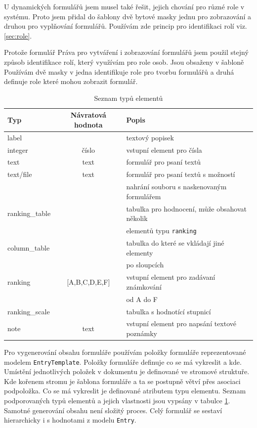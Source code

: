 U dynamických formulářů jsem musel také řešit, jejich chování pro různé role v systému. Proto jsem přidal do šablony dvě bytové masky jednu pro zobrazování a druhou pro vyplňování formulářů. Používám zde princip pro identifikaci rolí viz. \ref{sec:role}.

Protože formulář Práva pro vytváření i zobrazování formulářů jsem použil stejný způsob identifikace rolí, který využívám pro role osob. Jsou obsaženy v šabloně Používám dvě masky v  jedna  identifikuje role pro tvorbu formulářů a druhá definuje role které mohou zobrazit formulář.


\begin{table}[h]
\begin{center}
\begin{tabular}{|l|c|l|}

\hline
\textbf{Typ} & \textbf{Návratová hodnota} & \textbf{Popis} \\ \hline
label &  & textový popisek \\\hline
integer & číslo & vstupní element pro čísla \\ \hline
text & text & formulář pro psaní textů \\\hline
text/file & text & formulář pro psaní textů s možností \\ & &  nahrání souboru s naskenovaným formulářem \\\hline
ranking\_table &  & tabulka pro hodnocení, může obsahovat několik \\ & & elementů typu \verb|ranking| \\\hline
column\_table & & tabulka do které se vkládají jiné elementy \\ & &  po sloupcích \\\hline
ranking & [A,B,C,D,E,F] & vstupní element pro zadávaní známkování  \\ & &   od A do F \\\hline
ranking\_scale & & tabulka s hodnotící stupnicí \\\hline
note & text & vstupní element pro napsání textové poznámky \\\hline

\end{tabular}
\caption{Seznam typů elementů}
\label{tab:elements}
\end{center}
\end{table}

Pro vygenerování obsahu formuláře používám položky formuláře reprezentované modelem \verb|EntryTemplate|. Položky formuláře definuje co se má vykreslit a kde. Umístění jednotlivých položek v dokumentu je definované ve stromové struktuře. Kde kořenem stromu je šablona formuláře a ta se postupně větví přes asociaci podpoložka. Co se má vykreslit je definované atributem typu elementu. Seznam podporovaných typů elementů a jejich vlastnosti jsou vypsány v tabulce \ref{tab:elements}. Samotné generování obsahu není složitý proces. Celý formulář se sestaví hierarchicky i s hodnotami z modelu \verb|Entry|.

